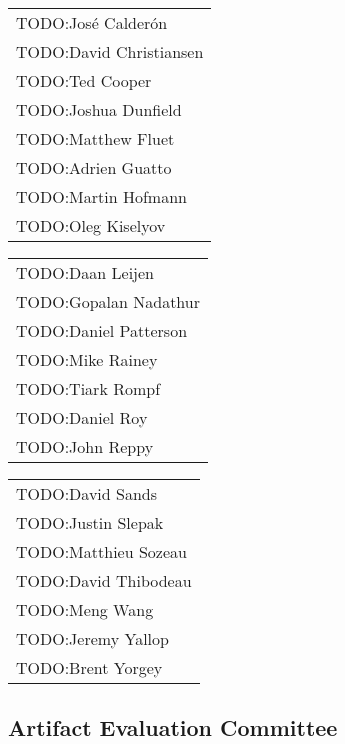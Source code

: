\begin{tabular}[t]{@{}p{\namewidth}}
TODO:José Calderón\\
TODO:David Christiansen\\
TODO:Ted Cooper\\
TODO:Joshua Dunfield\\
TODO:Matthew Fluet\\
TODO:Adrien Guatto \\
TODO:Martin Hofmann\\
TODO:Oleg Kiselyov\\
\end{tabular}%
\begin{tabular}[t]{p{\namewidth}}
TODO:Daan Leijen\\
TODO:Gopalan Nadathur\\
TODO:Daniel Patterson\\
TODO:Mike Rainey\\
TODO:Tiark Rompf\\
TODO:Daniel Roy\\
TODO:John Reppy\\
\end{tabular}%
\begin{tabular}[t]{p{\namewidth}}
TODO:David Sands\\
TODO:Justin Slepak\\
TODO:Matthieu Sozeau\\
TODO:David Thibodeau\\
TODO:Meng Wang\\
TODO:Jeremy Yallop\\
TODO:Brent Yorgey
\end{tabular}

\subsection*{\sffamily Artifact Evaluation Committee}

